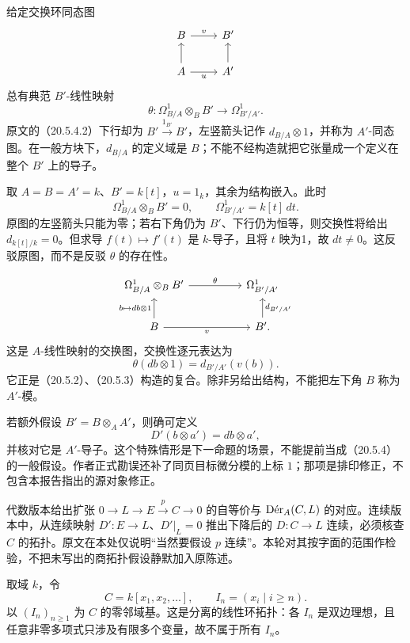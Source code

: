 给定交换环同态图
\[
\begin{tikzcd}
 B\arrow[r,"v"]&B'\\
 A\arrow[r,"u"']\arrow[u]&A'\arrow[u]
\end{tikzcd}
\]
总有典范 $B'$-线性映射
\[
 \theta:\Omega^1_{B/A}\otimes_B B'\longrightarrow\Omega^1_{B'/A'}.
\]
原文的（20.5.4.2）下行却为 $B'\xrightarrow{1_{B'}}B'$，左竖箭头记作 $d_{B/A}\otimes1$，并称为 $A'$-同态图。在一般方块下，$d_{B/A}$ 的定义域是 $B$；不能不经构造就把它张量成一个定义在整个 $B'$ 上的导子。

取 $A=B=A'=k$、$B'=k[t]$，$u=1_k$，其余为结构嵌入。此时
\[
 \Omega^1_{B/A}\otimes_B B'=0,
 \qquad\Omega^1_{B'/A'}=k[t]\,dt.
\]
原图的左竖箭头只能为零；若右下角仍为 $B'$、下行仍为恒等，则交换性将给出 $d_{k[t]/k}=0$。但求导 $f(t)\mapsto f'(t)$ 是 $k$-导子，且将 $t$ 映为1，故 $dt\ne0$。这反驳原图，而不是反驳 $\theta$ 的存在性。

\[
\begin{tikzcd}[column sep=huge]
 \Omega^1_{B/A}\otimes_B B'\arrow[r,"\theta"]&\Omega^1_{B'/A'}\\
 B\arrow[u,"{b\mapsto db\otimes1}"]\arrow[r,"v"']&B'\arrow[u,"d_{B'/A'}"'].
\end{tikzcd}
\]
这是 $A$-线性映射的交换图，交换性逐元表达为
\[
 \theta(db\otimes1)=d_{B'/A'}(v(b)).
\]
它正是（20.5.2）、（20.5.3）构造的复合。除非另给出结构，不能把左下角 $B$ 称为 $A'$-模。

若额外假设 $B'=B\otimes_A A'$，则确可定义
\[
 D'(b\otimes a')=db\otimes a',
\]
并核对它是 $A'$-导子。这个特殊情形是下一命题的场景，不能提前当成（20.5.4）的一般假设。作者正式勘误还补了同页目标微分模的上标 $1$；那项是排印修正，不包含本报告指出的源对象修正。

代数版本给出扩张 $0\to L\to E\xrightarrow p C\to0$ 的自等价与 $\Der_A(C,L)$ 的对应。连续版本中，从连续映射 $D':E\to L$、$D'|_L=0$ 推出下降后的 $D:C\to L$ 连续，必须核查 $C$ 的拓扑。原文在本处仅说明“当然要假设 $p$ 连续”。本轮对其按字面的范围作检验，不把未写出的商拓扑假设静默加入原陈述。

取域 $k$，令
\[
 C=k[x_1,x_2,\ldots],\qquad
 I_n=(x_i\mid i\ge n).
\]
以 $(I_n)_{n\ge1}$ 为 $C$ 的零邻域基。这是分离的线性环拓扑：各 $I_n$ 是双边理想，且任意非零多项式只涉及有限多个变量，故不属于所有 $I_n$。

